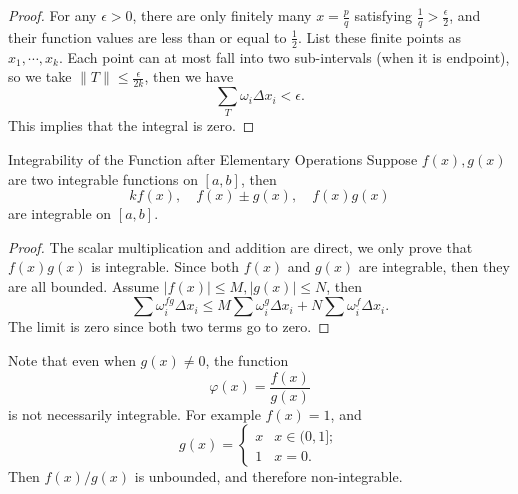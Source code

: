 \begin{proof}
  For any $\epsilon > 0$, there are only finitely many $x = \frac{p}{q}$ satisfying
  $\frac{1}{q} > \frac{\epsilon}{2}$,
  and their function values are less than or equal to $\frac{1}{2}$.
  List these finite points as $x_1,\cdots,x_k$.
  Each point can at most fall into two sub-intervals (when it is endpoint),
  so we take $\|T\| \leq \frac{\epsilon}{2k}$,
  then we have
  \begin{equation}
    \sum _T \omega_i \Delta x_i < \epsilon.
  \end{equation}
  This implies that the integral is zero.
\end{proof}

\begin{proposition}{Integrability of the Function after Elementary Operations}{}
  Suppose $f(x), g(x)$ are two integrable functions on $[a, b]$,
  then 
  \begin{equation}
    kf(x), \quad f(x) \pm g(x), \quad f(x)g(x)
  \end{equation}
  are integrable on $[a, b]$.
\end{proposition}

\begin{proof}
  The scalar multiplication and addition are direct,
  we only prove that $f(x)g(x)$ is integrable.
  Since both $f(x)$ and $g(x)$ are integrable, then they are all bounded.
  Assume $|f(x)| \leq M, |g(x)| \leq N$, then
  \begin{equation}
    \sum \omega_i^{fg} \Delta x_i \leq
    M \sum \omega_i^g \Delta x_i + N \sum \omega_i^f \Delta x_i.
  \end{equation}
  The limit is zero since both two terms go to zero.
\end{proof}

\begin{note}
  Note that even when $g(x) \neq 0$, the function
  \begin{equation}
    \varphi(x) = \frac{f(x)}{g(x)}
  \end{equation}
  is not necessarily integrable.
  For example $f(x) = 1$, and
  \begin{equation}
    g(x) =
    \begin{cases}
      x & x \in (0, 1];\\
      1 & x = 0.
    \end{cases}
  \end{equation}
  Then $f(x)/g(x)$ is unbounded, and therefore non-integrable.
\end{note}

